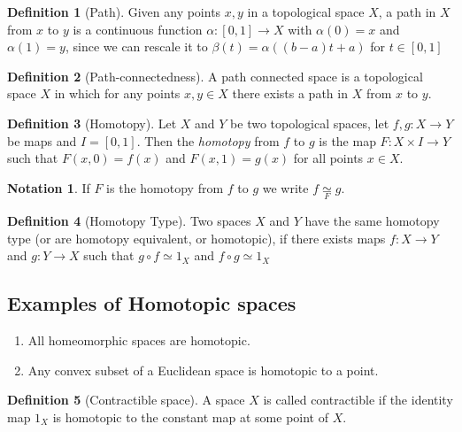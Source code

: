 \documentclass[a4paper, 12pt]{scrbook}
\theoremstyle{definition}
\newtheorem{defn}{Definition}[section]
\newtheorem*{notn}{Notation}
\newcommand{\lra}{\longrightarrow}
\newcommand{\disp}{\displaystyle}
\newcommand{\htp}[1]{\underset{#1}{\simeq}} %
\begin{document}
    \begin{defn}[Path]
        Given any points $x,y$ in a topological space $X$, a path in $X$ from $x$ to $y$ is a continuous function $\alpha : [0,1] \lra X$ with $\alpha(0) = x$ and $\alpha(1) = y$, since we can rescale it to $\beta(t) = \alpha((b-a)t + a)$ for $t \in [0,1]$
    \end{defn}
    \begin{defn}[Path-connectedness]
        A path connected space is a topological space $X$ in which for any points $x,y \in X$ there exists a path in $X$ from $x$ to $y$.
    \end{defn}
    
    \begin{defn}[Homotopy]
	Let $X$ and $Y$ be two topological spaces, let $f,g : X \lra Y$ be maps and $I = [0,1]$. Then the \textit{homotopy} from $f$ to $g$ is the map $F: X \times I \lra Y$ such that $F(x,0) = f(x)$ and $F(x,1) = g(x)$ for all points $x \in X$.
\end{defn}

\begin{notn}
	If $F$ is the homotopy from $f$ to $g$ we write $\disp f \htp{F} g.$
\end{notn}

\begin{defn}[Homotopy Type]
	Two spaces $X$ and $Y$ have the same homotopy type (or are homotopy equivalent, or homotopic), if there exists maps $f: X \lra Y$ and $g : Y \lra X$ such that $g \circ f \simeq 1_X$ and $f \circ g \simeq 1_X$
\end{defn}

\subsection*{Examples of Homotopic spaces}
\begin{enumerate}
	\item All homeomorphic spaces are homotopic.
	\item Any convex subset of a Euclidean space is homotopic to a point.
\end{enumerate}

\begin{defn}[Contractible space]
	A space $X$ is called contractible if the identity map $1_X$ is homotopic to the constant map at some point of $X$.
\end{defn}
    
    
    
    
    
    
    
    
    
    
    
    
    
    
    
    
\end{document}
